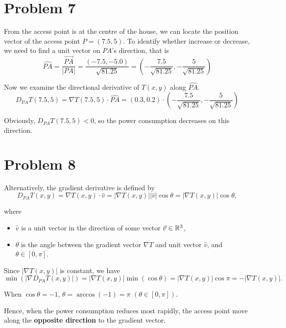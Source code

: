 \documentclass[12pt,a4paper]{article}
\begin{document}
\section*{Problem 7}
\begin{solution}
From the access point is at the centre of the house, we can locate the position vector of the access point $P=(7.5, 5)$. To identify whether increase or decrease, we need to find a unit vector on $PA$'s direction, that is
\[
\widehat{PA} = \frac{\overrightarrow{PA}}{|PA|} = \frac{\left(-7.5, -5.0 \right)}{\sqrt{81.25}} = \left(-\frac{7.5}{\sqrt{81.25}},-\frac{5}{\sqrt{81.25}}\right)
\]

Now we examine the directional derivative of $T(x,y)$ along $\widehat{PA}$.
\[
D_{PA}T(7.5,5) = \nabla T(7.5,5) \cdot \widehat{PA} = (0.3, 0.2) \cdot \left(-\frac{7.5}{\sqrt{81.25}},-\frac{5}{\sqrt{81.25}}\right)
\]

Obviously, $D_{PA}T(7.5,5) < 0$, so the power consumption decreases on this direction.
\end{solution}

\section*{Problem 8}
\begin{solution}

Alternatively, the gradient derivative is defined by
\[
D_{PA}T(x,y) = \nabla T(x,y) \cdot \hat{v} = |\nabla T(x,y)| |\hat{v}| \cos{\theta} = |\nabla T(x,y)|\cos{\theta},
\]

where 
\begin{itemize}
    \item $\hat{v}$ is a unit vector in the direction of some vector $\Vec{v} \in \mathbb{R}^3$, 
    \item $\theta$ is the angle between the gradient vector $\nabla T$ and unit vector $\hat{v}$, and $\theta \in [0, \pi]$.
\end{itemize}

Since $|\nabla T(x,y)|$ is constant, we have
\[
\min \left(|\nabla D_{PA}T(x,y)|\right) = |\nabla T(x,y)| \min(\cos{\theta}) =
|\nabla T(x,y)| \cos{\pi} = -|\nabla T(x,y)|.
\]

 When $\cos \theta = -1$, $\theta = \arccos({-1}) = \pi$ $(\theta \in [0,\pi])$.

 Hence, when the power consumption reduces most rapidly, the access point move along the \textbf{opposite direction} to the gradient vector.
\end{solution}
\end{document}
